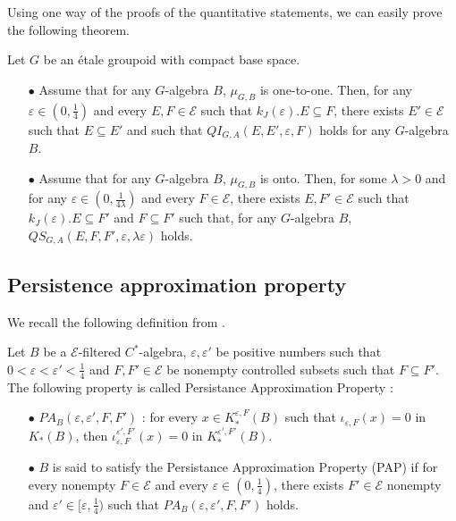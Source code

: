 Using one way of the proofs of the quantitative statements, we can easily prove the following theorem.

\begin{thm} Let $G$ be an étale groupoid with compact base space. 
\begin{itemize}
\item[$\bullet$] Assume that for any $G$-algebra $B$, $\mu_{G,B}$ is one-to-one. Then, for any $\varepsilon\in (0,\frac{1}{4})$ and every $E,F\in\mathcal E$ such that $k_J(\varepsilon). E\subseteq F$, there exists $E'\in\mathcal E$ such that $E\subseteq E'$ and such that $QI_{G,A}(E,E',\varepsilon,F)$ holds for any $G$-algebra $B$.
\item[$\bullet$] Assume that for any $G$-algebra $B$, $\mu_{G,B}$ is onto. Then, for some $\lambda>0$ and for any $\varepsilon\in (0,\frac{1}{4\lambda})$ and every $F\in\mathcal E$, there exists $E,F'\in\mathcal E$ such that $k_J(\varepsilon). E\subseteq F'$ and $F\subseteq F'$ such that, for any $G$-algebra $B$, $QS_{G,A}(E, F,F',\varepsilon,\lambda \varepsilon)$ holds.
\end{itemize}
\end{thm}

\subsection{Persistence approximation property}

We recall the following definition from \cite{OY3}.

\begin{definition}
Let $B$ be a $\mathcal E$-filtered $C^*$-algebra, $\varepsilon,\varepsilon'$ be positive numbers such that $0<\varepsilon <\varepsilon' <\frac{1}{4}$ and $F,F'\in\mathcal E$ be nonempty controlled subsets such that $F\subseteq F'$. The following property is called Persistance Approximation Property :
\begin{itemize}
\item[$\bullet$] $PA_B(\varepsilon,\varepsilon',F,F')$ : for every $x\in K_*^{\varepsilon,F}(B)$ such that $\iota_{\varepsilon,F}(x)=0$ in $K_*(B)$, then $\iota_{\varepsilon,F}^{\varepsilon',F'}(x)=0$ in $K_*^{\varepsilon',F'}(B)$.
\item[$\bullet$] $B$ is said to satisfy the Persistance Approximation Property (PAP) if for every nonempty $F\in\mathcal E$ and every $\varepsilon\in (0,\frac{1}{4})$, there exists $F'\in\mathcal E$ nonempty and $\varepsilon'\in [\varepsilon,\frac{1}{4})$ such that $PA_B(\varepsilon,\varepsilon',F,F')$ holds.
\end{itemize}
\end{definition}

